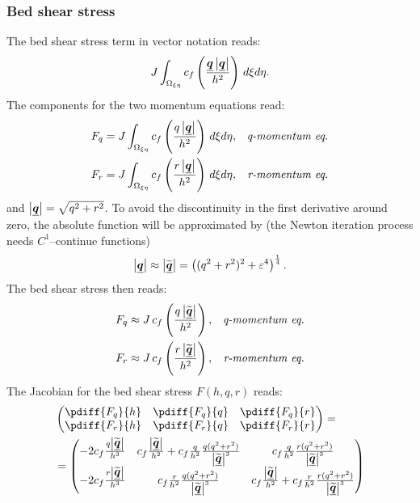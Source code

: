\subsubsection{Bed shear stress}
The bed shear stress term in vector notation reads:
\begin{align}
    J\int_{\Omega_{\xi\eta}} c_f \left( \frac{\mbox{\boldmath $\underline{q}$}\left\lvert \mbox{\boldmath $\underline{q}$} \right\rvert}{h^2} \right)\, d\xi d\eta.
\end{align}
The components for the two momentum equations read:
\begin{align}
    F_q &= J\int_{\Omega_{\xi\eta}} c_f \left( \frac{q\left\lvert \mbox{\boldmath $\underline{q}$} \right\rvert}{h^2} \right)\, d\xi d\eta, & \textit{q-momentum eq.}
    \\
    F_r &= J\int_{\Omega_{\xi\eta}} c_f \left( \frac{r\left\lvert \mbox{\boldmath $\underline{q}$} \right\rvert}{h^2} \right)\, d\xi d\eta, & \textit{r-momentum eq.}
\end{align}
and $\left\lvert \mbox{\boldmath $\underline{q}$} \right\rvert = \sqrt{q^2 + r^2}$.
To avoid the discontinuity in the first derivative around zero, the absolute function will be approximated by (the Newton iteration process needs $C^1$--continue functions)
\begin{align}
    \left\lvert \mbox{\boldmath $\underline{q}$} \right\rvert \approx \left\lvert \widetilde{\mbox{\boldmath $\underline{q}$}} \right\rvert = \left( (q^2 + r^2)^2 + \varepsilon^4 \right)^{\frac{1}{4}}.
\end{align}
The bed shear stress then reads:
\begin{align}
    F_q &\approx J\, c_f \left( \frac{q\left\lvert \widetilde{\mbox{\boldmath $\underline{q}$}} \right\rvert}{h^2} \right), & \textit{q-momentum eq.}
    \label{eq:xi_bed_shear_stress_term}
    \\
    F_r &\approx J\, c_f \left( \frac{r\left\lvert \widetilde{\mbox{\boldmath $\underline{q}$}} \right\rvert}{h^2} \right), & \textit{r-momentum eq.}
    \label{eq:eta_bed_shear_stress_term}
\end{align}
The Jacobian for the bed shear stress $F(h,q,r)$ reads:
\begin{align}
    &\begin{pmatrix}
        \pdiff{F_q}{h} & \pdiff{F_q}{q} & \pdiff{F_q}{r}
        \\
        \pdiff{F_r}{h} & \pdiff{F_r}{q} & \pdiff{F_r}{r}
    \end{pmatrix}
    =
    \\
    &=
    \begin{pmatrix}
       -2c_f \frac{q\abs{\widetilde{\vec{q}}}}{h^3}
       & c_f\frac{\abs{\widetilde{\vec{q}}}}{h^2}
       + c_f \frac{q}{h^2} \frac{q(q^2+ r^2)}{\abs{\widetilde{\vec{q}}}^3}
       & c_f \frac{q}{h^2}\frac{r(q^2+ r^2)}{\abs{\widetilde{\vec{q}}}^3}
       \\
       -2c_f \frac{r\abs{\widetilde{\vec{q}}}}{h^3}
       & c_f \frac{r}{h^2}\frac{q(q^2+ r^2)}{\abs{\widetilde{\vec{q}}}^3}
       & c_f\frac{\abs{\widetilde{\vec{q}}}}{h^2}
       + c_f \frac{r}{h^2}\frac{r(q^2+ r^2)}{\abs{\widetilde{\vec{q}}}^3}
    \end{pmatrix}
\end{align}
